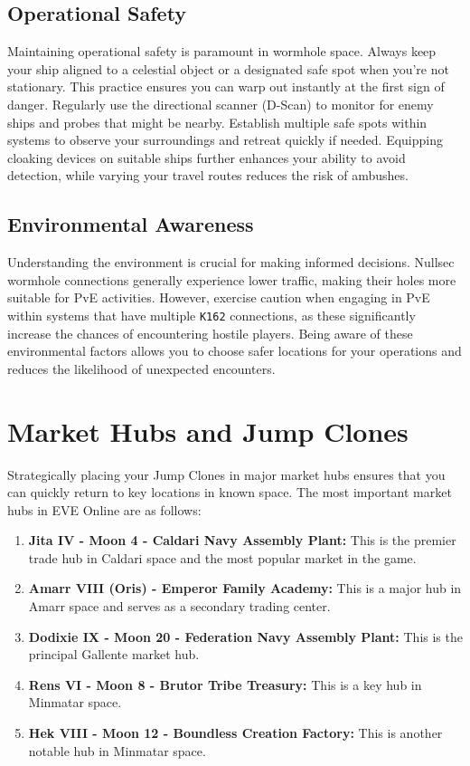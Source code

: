 \documentclass[a4paper,12pt]{report}
\begin{document}
\section{Operational Safety}

Maintaining operational safety is paramount in wormhole space. Always keep your ship aligned to a celestial object or a designated safe spot when you're not stationary. This practice ensures you can warp out instantly at the first sign of danger. Regularly use the directional scanner (D-Scan) to monitor for enemy ships and probes that might be nearby. Establish multiple safe spots within systems to observe your surroundings and retreat quickly if needed. Equipping cloaking devices on suitable ships further enhances your ability to avoid detection, while varying your travel routes reduces the risk of ambushes.

\section{Environmental Awareness}

Understanding the environment is crucial for making informed decisions. Nullsec wormhole connections generally experience lower traffic, making their holes more suitable for PvE activities. However, exercise caution when engaging in PvE within systems that have multiple \texttt{K162} connections, as these significantly increase the chances of encountering hostile players. Being aware of these environmental factors allows you to choose safer locations for your operations and reduces the likelihood of unexpected encounters.

\chapter{Market Hubs and Jump Clones}

Strategically placing your Jump Clones in major market hubs ensures that you can quickly return to key locations in known space. The most important market hubs in EVE Online are as follows:
\begin{enumerate}
    \item \textbf{Jita IV - Moon 4 - Caldari Navy Assembly Plant:} This is the premier trade hub in Caldari space and the most popular market in the game.
    \item \textbf{Amarr VIII (Oris) - Emperor Family Academy:} This is a major hub in Amarr space and serves as a secondary trading center.
    \item \textbf{Dodixie IX - Moon 20 - Federation Navy Assembly Plant:} This is the principal Gallente market hub.
    \item \textbf{Rens VI - Moon 8 - Brutor Tribe Treasury:} This is a key hub in Minmatar space.
    \item \textbf{Hek VIII - Moon 12 - Boundless Creation Factory:} This is another notable hub in Minmatar space.
\end{enumerate}
\end{document}

